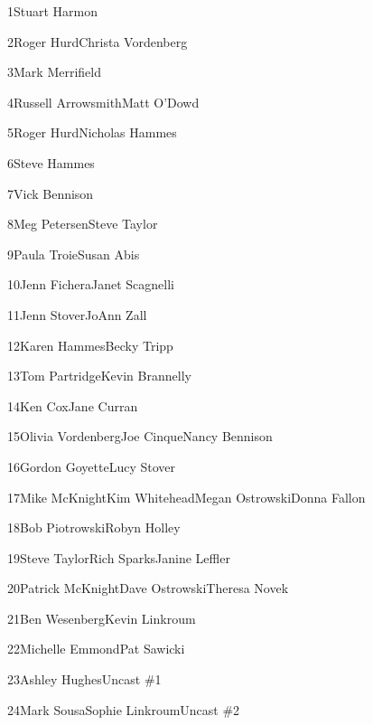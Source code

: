\parbox[t]{4.75in}{1\hfil\break Stuart Harmon}\hfil\break\vskip 0.25in
\parbox[t]{4.75in}{2\hfil\break Roger Hurd\hfil\break Christa Vordenberg}\hfil\break\vskip 0.25in
\parbox[t]{4.75in}{3\hfil\break Mark Merrifield}\hfil\break\vskip 0.25in
\parbox[t]{4.75in}{4\hfil\break Russell Arrowsmith\hfil\break Matt O'Dowd}\hfil\break\vskip 0.25in
\parbox[t]{4.75in}{5\hfil\break Roger Hurd\hfil\break Nicholas Hammes}\hfil\break\vskip 0.25in
\parbox[t]{4.75in}{6\hfil\break Steve Hammes}\hfil\break\vskip 0.25in
\parbox[t]{4.75in}{7\hfil\break Vick Bennison}\hfil\break\vskip 0.25in
\parbox[t]{4.75in}{8\hfil\break Meg Petersen\hfil\break Steve Taylor}\hfil\break\vskip 0.25in
\parbox[t]{4.75in}{9\hfil\break Paula Troie\hfil\break Susan Abis}\hfil\break\vskip 0.25in
\parbox[t]{4.75in}{10\hfil\break Jenn Fichera\hfil\break Janet Scagnelli}\hfil\break\vskip 0.25in
\parbox[t]{4.75in}{11\hfil\break Jenn Stover\hfil\break JoAnn Zall}\hfil\break\vskip 0.25in
\parbox[t]{4.75in}{12\hfil\break Karen Hammes\hfil\break Becky Tripp}\hfil\break\vskip 0.25in
\parbox[t]{4.75in}{13\hfil\break Tom Partridge\hfil\break Kevin Brannelly}\hfil\break\vskip 0.25in
\parbox[t]{4.75in}{14\hfil\break Ken Cox\hfil\break Jane Curran}\hfil\break\vskip 0.25in
\parbox[t]{4.75in}{15\hfil\break Olivia Vordenberg\hfil\break Joe Cinque\hfil\break Nancy Bennison}\hfil\break\vskip 0.25in
\parbox[t]{4.75in}{16\hfil\break Gordon Goyette\hfil\break Lucy Stover}\hfil\break\vskip 0.25in
\parbox[t]{4.75in}{17\hfil\break Mike McKnight\hfil\break Kim Whitehead\hfil\break Megan Ostrowski\hfil\break Donna Fallon}\hfil\break\vskip 0.25in
\parbox[t]{4.75in}{18\hfil\break Bob Piotrowski\hfil\break Robyn Holley}\hfil\break\vskip 0.25in
\parbox[t]{4.75in}{19\hfil\break Steve Taylor\hfil\break Rich Sparks\hfil\break Janine Leffler}\hfil\break\vskip 0.25in
\parbox[t]{4.75in}{20\hfil\break Patrick McKnight\hfil\break Dave Ostrowski\hfil\break Theresa Novek}\hfil\break\vskip 0.25in
\parbox[t]{4.75in}{21\hfil\break Ben Wesenberg\hfil\break Kevin Linkroum}\hfil\break\vskip 0.25in
\parbox[t]{4.75in}{22\hfil\break Michelle Emmond\hfil\break Pat Sawicki}\hfil\break\vskip 0.25in
\parbox[t]{4.75in}{23\hfil\break Ashley Hughes\hfil\break Uncast \#1}\hfil\break\vskip 0.25in
\parbox[t]{4.75in}{24\hfil\break Mark Sousa\hfil\break Sophie Linkroum\hfil\break Uncast \#2}\hfil\break\vskip 0.25in
